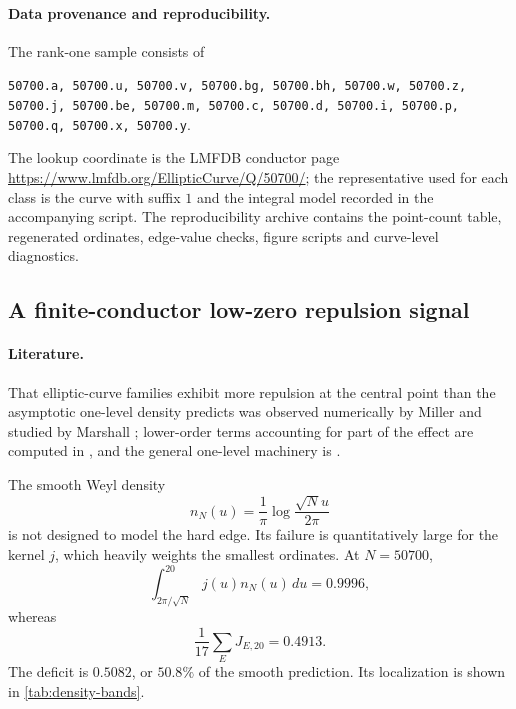 \documentclass[11pt,reqno]{amsart}
\theoremstyle{remark}
\begin{document}
\paragraph{Data provenance and reproducibility.}
The rank-one sample consists of
\begin{center}
\small
\texttt{50700.a, 50700.u, 50700.v, 50700.bg, 50700.bh, 50700.w, 50700.z,}\\
\texttt{50700.j, 50700.be, 50700.m, 50700.c, 50700.d, 50700.i, 50700.p,}\\
\texttt{50700.q, 50700.x, 50700.y}.
\end{center}
The lookup coordinate is the LMFDB conductor page
\url{https://www.lmfdb.org/EllipticCurve/Q/50700/}; the representative used for each class is the curve with suffix $1$ and the integral model recorded in the accompanying script.  The reproducibility archive contains the point-count table, regenerated ordinates, edge-value checks, figure scripts and curve-level diagnostics.

\subsection{A finite-conductor low-zero repulsion signal}

\paragraph{Literature.}
That elliptic-curve families exhibit more repulsion at the central point than the asymptotic one-level density predicts was observed numerically by Miller \cite{Miller2006} and studied by Marshall \cite{Marshall2013}; lower-order terms accounting for part of the effect are computed in \cite{HKS2009}, and the general one-level machinery is \cite{ILS2000,Miller2004}.

The smooth Weyl density
\begin{equation}
  n_N(u)=\frac1\pi\log\frac{\sqrt N u}{2\pi}
\end{equation}
is not designed to model the hard edge.  Its failure is quantitatively large for the kernel $j$, which heavily weights the smallest ordinates.  At $N=50700$,
\begin{equation}
  \int_{2\pi/\sqrt N}^{20}j(u)n_N(u)\,du=0.9996,
\end{equation}
whereas
\begin{equation}
  \frac1{17}\sum_E J_{E,20}=0.4913.
\end{equation}
The deficit is $0.5082$, or $50.8\%$ of the smooth prediction.  Its localization is shown in \cref{tab:density-bands}.
\end{document}
